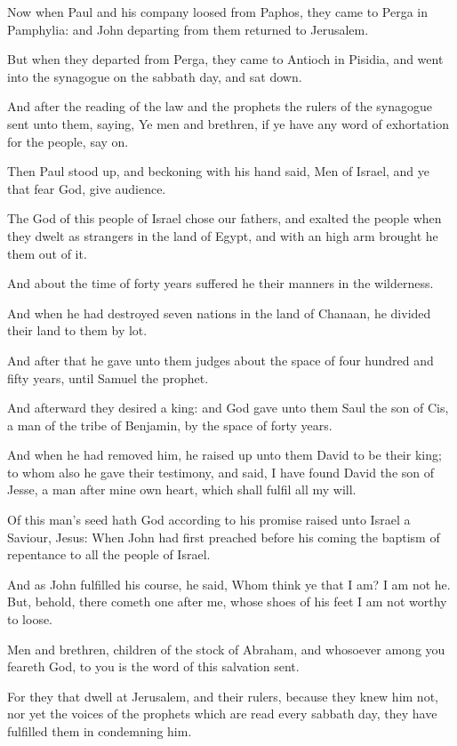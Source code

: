 \Verse Now when Paul and his company loosed from Paphos, they came to Perga in Pamphylia: and John departing from them returned to Jerusalem.

\Verse But when they departed from Perga, they came to Antioch in Pisidia, and went into the synagogue on the sabbath day, and sat down.

\Verse And after the reading of the law and the prophets the rulers of the synagogue sent unto them, saying, Ye men and brethren, if ye have any word of exhortation for the people, say on.

\Verse Then Paul stood up, and beckoning with his hand said, Men of Israel, and ye that fear God, give audience.

\Verse The God of this people of Israel chose our fathers, and exalted the people when they dwelt as strangers in the land of Egypt, and with an high arm brought he them out of it.

\Verse And about the time of forty years suffered he their manners in the wilderness.

\Verse And when he had destroyed seven nations in the land of Chanaan, he divided their land to them by lot.

\Verse And after that he gave unto them judges about the space of four hundred and fifty years, until Samuel the prophet.

\Verse And afterward they desired a king: and God gave unto them Saul the son of Cis, a man of the tribe of Benjamin, by the space of forty years.

\Verse And when he had removed him, he raised up unto them David to be their king; to whom also he gave their testimony, and said, I have found David the son of Jesse, a man after mine own heart, which shall fulfil all my will.

\Verse Of this man's seed hath God according to his promise raised unto Israel a Saviour, Jesus: \Verse When John had first preached before his coming the baptism of repentance to all the people of Israel.

\Verse And as John fulfilled his course, he said, Whom think ye that I am?  I am not he. But, behold, there cometh one after me, whose shoes of his feet I am not worthy to loose.

\Verse Men and brethren, children of the stock of Abraham, and whosoever among you feareth God, to you is the word of this salvation sent.

\Verse For they that dwell at Jerusalem, and their rulers, because they knew him not, nor yet the voices of the prophets which are read every sabbath day, they have fulfilled them in condemning him.

